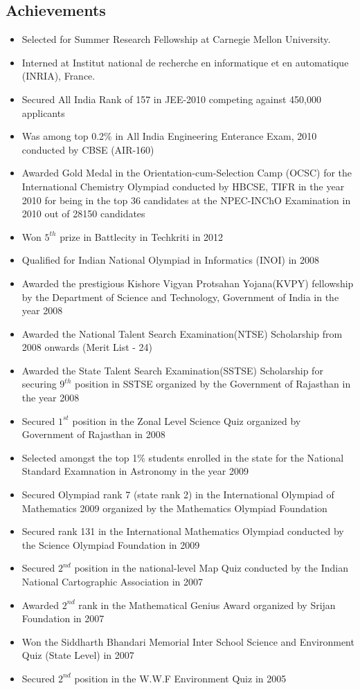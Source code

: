 \documentclass[margin,line]{resume}
\begin{document}
\begin{resume}
  \section{\mysidestyle Achievements}
  \begin{itemize}
  \item Selected for Summer Research Fellowship at Carnegie Mellon University.
  \item Interned at Institut national de recherche en informatique et en automatique (INRIA), France.
  \item Secured All India Rank of 157 in JEE-2010 competing against 450,000 applicants
  \item Was among top 0.2\% in All India Engineering Enterance Exam, 2010 conducted by CBSE (AIR-160)
  \item Awarded Gold Medal in the Orientation-cum-Selection Camp (OCSC) for the International Chemistry Olympiad conducted by HBCSE, TIFR in the year 2010 for being in the top 36 candidates at the NPEC-INChO Examination in 2010 out of 28150 candidates
  \item Won $5^{th}$ prize in Battlecity in Techkriti in 2012
  \item Qualified for Indian National Olympiad in Informatics (INOI) in 2008
  \item Awarded the prestigious Kishore Vigyan Protsahan Yojana(KVPY) fellowship by the Department of Science and Technology, Government of India in the year 2008
  \item Awarded the National Talent Search Examination(NTSE) Scholarship from 2008 onwards (Merit List - 24)
  \item Awarded the State Talent Search Examination(SSTSE) Scholarship for securing $9^{th}$ position in SSTSE organized by the Government of Rajasthan in the year 2008
  \item Secured $1^{st}$ position in the Zonal Level Science Quiz organized by Government of Rajasthan in 2008
  \item Selected amongst the top 1\% students enrolled in the state for the National Standard Examnation in Astronomy in the year 2009
  \item Secured Olympiad rank 7 (state rank 2) in the International Olympiad of Mathematics 2009 organized by the Mathematics Olympiad Foundation
  \item Secured rank 131 in the International Mathematics Olympiad conducted by the Science Olympiad Foundation in 2009
  \item Secured $2^{nd}$ position in the national-level Map Quiz conducted by the Indian National Cartographic Association in 2007
  \item Awarded $2^{nd}$ rank in the Mathematical Genius Award organized by Srijan Foundation in 2007
  \item Won the Siddharth Bhandari Memorial Inter School Science and Environment Quiz (State Level) in 2007
  \item Secured $2^{nd}$ position in the W.W.F Environment Quiz in 2005
  \end{itemize}

\end{resume}
\end{document}
